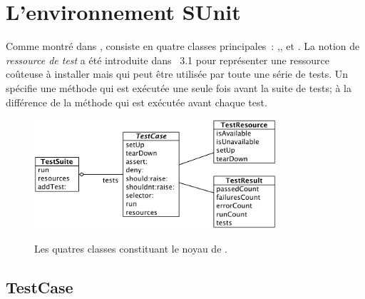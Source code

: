 \documentclass[a4paper,10pt,twoside]{book}
\begin{document}
\section{L'environnement SUnit}

Comme montré dans , \sunit consiste en quatre classes 
principales~: ,,  et .
La notion de \emph{ressource de test} a été introduite dans \sunit~3.1 pour représenter 
une ressource coûteuse à installer mais qui peut être utilisée par toute une série de tests. 
Un  spécifie une méthode  qui est exécutée une seule fois avant 
la suite de tests; à la différence de la méthode  qui est exécutée avant chaque test.

\begin{figure}[htb]
  \begin{center}
		{\includegraphics[width=0.8\textwidth]{sunit-classes}}
	\caption{Les quatres classes constituant le noyau de \SUnit.}
	\label{fig:sunit-classes}
  \end{center}
\end{figure}


\subsection{TestCase}
\end{document}
